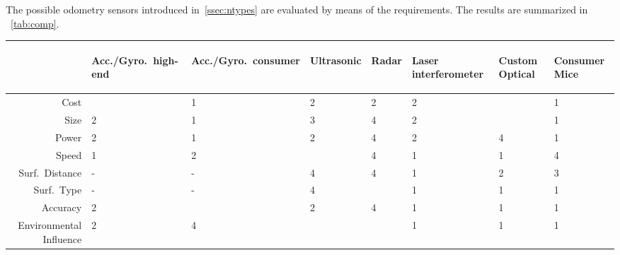 \documentclass[12pt,a4paper]{article}
\begin{document}
The possible odometry sensors introduced in~\autoref{ssec:ntypes} are evaluated by means of the requirements.
The results are summarized in ~\autoref{tab:comp}.

\begin{table}[htbp]
 \begin{threeparttable}[b]
  \centering
  \begin{tabular}{rlllllll}
      & \begin{turn}{60} Acc./Gyro.\ high-end  \end{turn} \hspace{-18mm} & \begin{turn}{60} Acc./Gyro.\ consumer  \end{turn} \hspace{-18mm} & \begin{turn}{60} Ultrasonic \end{turn} \hspace{-8mm} & \begin{turn}{60}  Radar  \end{turn}  \hspace{-5mm} & \begin{turn}{60}Laser interferometer \end{turn} \hspace{-18mm} & \begin{turn}{60}Custom Optical \end{turn} \hspace{-15mm} & \begin{turn}{60}Consumer Mice\end{turn} \hspace{-10mm}\\
     \hline
     Cost   & \color{red}{5}   & 1     & 2   &  2 & 2 & \color{red}{5}\tnote{4} & 1\\
     Size   & 2   & 1     & 3   &  4 & 2 & \color{red}{5} & 1\\
     Power   & 2   & 1     & 2   &  4 & 2 & 4 & 1 \\
     Speed   & 1   & 2     & \color{red}{5}\tnote{1}   &  4 & 1 & 1 & 4\\
     Surf.\ Distance   & -   & -     & 4   &  4 & 1 & 2 & 3\\
     Surf.\ Type   & -   & -     & 4   &  \color{red}{5}\tnote{3} & 1 & 1 & 1\\
     Accuracy  & 2   & \color{red}{5}     & 2   &  4 & 1 & 1 & 1\\
     Environmental Influence  & 2   & 4     & \color{red}{5}\tnote{2}   &  \color{red}{5} & 1 & 1 & 1\\

\end{tabular}
\end{threeparttable}
\end{table}
\end{document}
